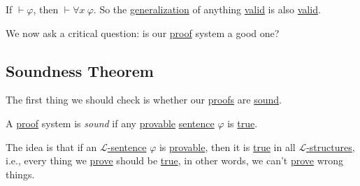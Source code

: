 \begin{corollary}
	If \(\vdash \varphi \), then \(\vdash \forall x\ \varphi \). So the \hyperref[def:generalization]{generalization} of anything \hyperref[def:valid]{valid} is also \hyperref[def:valid]{valid}.
\end{corollary}

We now ask a critical question: is our \hyperref[def:proof]{proof} system a good one?

\subsection{Soundness Theorem}
The first thing we should check is whether our \hyperref[def:proof]{proofs} are \hyperref[def:sound]{sound}.

\begin{definition}[Sound]\label{def:sound}
	A \hyperref[def:proof]{proof} system is \emph{sound} if any \hyperref[def:proof]{provable} \hyperref[def:sentence]{sentence} \(\varphi \) is \hyperref[def:truth]{true}.
\end{definition}

The idea is that if an \hyperref[def:sentence]{\(\mathcal{L} \)-sentence} \(\varphi \) is \hyperref[def:proof]{provable}, then it is \hyperref[def:truth]{true} in all \hyperref[def:structure]{\(\mathcal{L} \)-structures}, i.e., every thing we \hyperref[def:proof]{prove} should be \hyperref[def:truth]{true}, in other words, we can't \hyperref[def:proof]{prove} wrong things.

